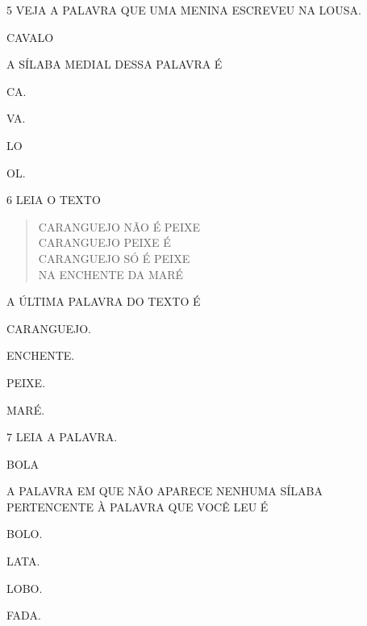 \pagebreak

\num{5} VEJA A PALAVRA QUE UMA MENINA ESCREVEU NA LOUSA.

\begin{myquote}
\centering\large{CAVALO}
\end{myquote}

A SÍLABA MEDIAL DESSA PALAVRA É

\begin{escolha}
\item CA.

\item VA.

\item LO

\item OL.
\end{escolha}


\num{6} LEIA O TEXTO

\begin{myquote}
\begin{verse}
CARANGUEJO NÃO É PEIXE\\
CARANGUEJO PEIXE É\\
CARANGUEJO SÓ É PEIXE\\
NA ENCHENTE DA MARÉ
\end{verse}

\end{myquote}

A ÚLTIMA PALAVRA DO TEXTO É

\begin{escolha}
\item CARANGUEJO.

\item ENCHENTE.

\item PEIXE.

\item MARÉ.
\end{escolha}

\pagebreak

\num{7} LEIA A PALAVRA.

\begin{myquote}
\centering\large{BOLA}
\end{myquote}

A PALAVRA EM QUE NÃO APARECE NENHUMA SÍLABA PERTENCENTE À PALAVRA QUE VOCÊ LEU É 

\begin{escolha}
\item BOLO.

\item LATA.

\item LOBO.

\item FADA.
\end{escolha}


